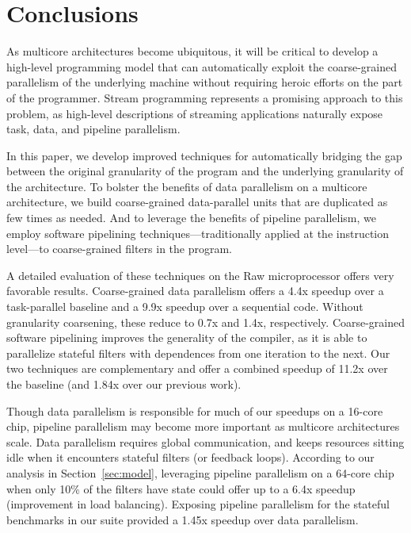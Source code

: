 \section{Conclusions}

As multicore architectures become ubiquitous, it will be critical to
develop a high-level programming model that can automatically exploit
the coarse-grained parallelism of the underlying machine without
requiring heroic efforts on the part of the programmer.  Stream
programming represents a promising approach to this problem, as
high-level descriptions of streaming applications naturally expose
task, data, and pipeline parallelism.  

In this paper, we develop improved techniques for automatically
bridging the gap between the original granularity of the program and
the underlying granularity of the architecture.  To bolster the
benefits of data parallelism on a multicore architecture, we build
coarse-grained data-parallel units that are duplicated as few times as
needed.  And to leverage the benefits of pipeline parallelism, we
employ software pipelining techniques---traditionally applied at the
instruction level---to coarse-grained filters in the program.

A detailed evaluation of these techniques on the Raw microprocessor
offers very favorable results.  Coarse-grained data parallelism offers
a 4.4x speedup over a task-parallel baseline and a 9.9x speedup over a
sequential code.  Without granularity coarsening, these reduce to 0.7x
and 1.4x, respectively.  Coarse-grained software pipelining improves
the generality of the compiler, as it is able to parallelize stateful
filters with dependences from one iteration to the next.  Our two
techniques are complementary and offer a combined speedup of 11.2x
over the baseline (and 1.84x over our previous work).

Though data parallelism is responsible for much of our speedups on a
16-core chip, pipeline parallelism may become more important as
multicore architectures scale.  Data parallelism requires global
communication, and keeps resources sitting idle when it encounters
stateful filters (or feedback loops).  According to our analysis in
Section~\ref{sec:model}, leveraging pipeline parallelism on a 64-core
chip when only 10\% of the filters have state could offer up to a 6.4x
speedup (improvement in load balancing).  Exposing pipeline
parallelism for the stateful benchmarks in our suite provided a 1.45x
speedup over data parallelism.  

